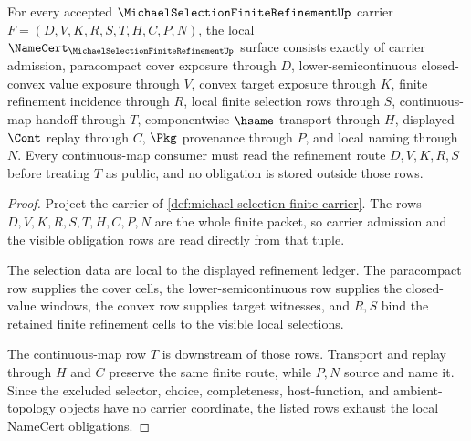 \begin{theorem}
\label{thm:michael-selection-finite-namecert-obligations}
For every accepted $\MichaelSelectionFiniteRefinementUp$ carrier $F=(D,V,K,R,S,T,H,C,P,N)$, the local $\NameCert_{\MichaelSelectionFiniteRefinementUp}$ surface consists exactly of carrier admission, paracompact cover exposure through $D$, lower-semicontinuous closed-convex value exposure through $V$, convex target exposure through $K$, finite refinement incidence through $R$, local finite selection rows through $S$, continuous-map handoff through $T$, componentwise $\hsame$ transport through $H$, displayed $\Cont$ replay through $C$, $\Pkg$ provenance through $P$, and local naming through $N$. Every continuous-map consumer must read the refinement route $D,V,K,R,S$ before treating $T$ as public, and no obligation is stored outside those rows.
\end{theorem}
\begin{proof}
Project the carrier of \autoref{def:michael-selection-finite-carrier}. The rows $D,V,K,R,S,T,H,C,P,N$ are the whole finite packet, so carrier admission and the visible obligation rows are read directly from that tuple.

The selection data are local to the displayed refinement ledger. The paracompact row supplies the cover cells, the lower-semicontinuous row supplies the closed-value windows, the convex row supplies target witnesses, and $R,S$ bind the retained finite refinement cells to the visible local selections.

The continuous-map row $T$ is downstream of those rows. Transport and replay through $H$ and $C$ preserve the same finite route, while $P,N$ source and name it. Since the excluded selector, choice, completeness, host-function, and ambient-topology objects have no carrier coordinate, the listed rows exhaust the local NameCert obligations.
\end{proof}

